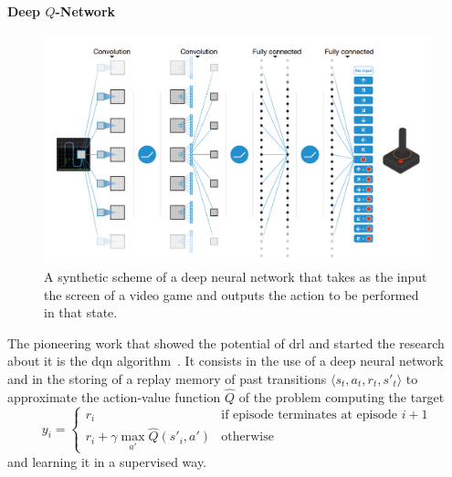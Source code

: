 \paragraph{Deep $Q$-Network}\label{S:dqn}
\begin{figure}[t]
\begin{minipage}{\textwidth}
\begin{center}
  \includegraphics[scale=.19]{img/dqn.png}
\end{center}
\end{minipage}
\caption[DQN network scheme]{A synthetic scheme of a deep neural network that takes as the input the screen of a video game and outputs the action to be performed in that state.}
\end{figure}
The pioneering work that showed the potential of \gls{drl} and started the research about it is the \gls{dqn} algorithm~\cite{mnih2015human}. It consists in the use of a deep neural network and in the storing of a replay memory of past transitions $\langle s_t, a_t, r_t, s'_t \rangle$ to approximate the action-value function $\hat{Q}$ of the problem computing the target
\begin{equation}\label{E:dqn_update}
y_i=
    \begin{cases}
    r_i & \text{if episode terminates at episode }i+1\\
    r_i + \gamma \max_{a'} \hat{Q}(s'_i, a') & \text{otherwise}
    \end{cases}
\end{equation}
and learning it in a supervised way.

